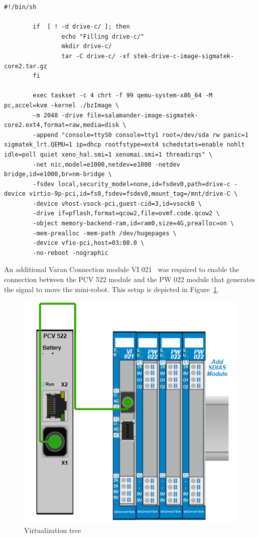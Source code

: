 \documentclass[MMR,Master,english]{twbook}
\begin{document}
\clearpage

\vspace*{-5em}
\begin{lstlisting}[name={Include PCI in QEMU for Salamander 4 Virtualization},label={script:qemu_def_pci}]
		#!/bin/sh

		if  [ ! -d drive-c/ ]; then
				echo "Filling drive-c/"
				mkdir drive-c/
				tar -C drive-c/ -xf stek-drive-c-image-sigmatek-core2.tar.gz
		fi
			
		exec taskset -c 4 chrt -f 99 qemu-system-x86_64 -M pc,accel=kvm -kernel ./bzImage \
		-m 2048 -drive file=salamander-image-sigmatek-core2.ext4,format=raw,media=disk \
		-append "console=ttyS0 console=tty1 root=/dev/sda rw panic=1 sigmatek_lrt.QEMU=1 ip=dhcp rootfstype=ext4 schedstats=enable nohlt idle=poll quiet xeno_hal.smi=1 xenomai.smi=1 threadirqs" \
		-net nic,model=e1000,netdev=e1000 -netdev bridge,id=e1000,br=nm-bridge \
		-fsdev local,security_model=none,id=fsdev0,path=drive-c -device virtio-9p-pci,id=fs0,fsdev=fsdev0,mount_tag=/mnt/drive-C \
		-device vhost-vsock-pci,guest-cid=3,id=vsock0 \
		-drive if=pflash,format=qcow2,file=ovmf.code.qcow2 \
		-object memory-backend-ram,id=ram0,size=4G,prealloc=on \
		-mem-prealloc -mem-path /dev/hugepages \
		-device vfio-pci,host=03:00.0 \
		-no-reboot -nographic
	\end{lstlisting}
\vspace{2em}
\noindent An additional Varan Connection module VI 021~\cite{InterfacesSplittersSIGMATEK} was required to enable the connection between the PCV 522 module and the PW 022 module that generates the signal to move the mini-robot. This setup is depicted in Figure~\ref{fig:virt_tree}.

\begin{figure}[H]
	\centering
	\includegraphics[width=0.5\columnwidth]{img/experiment/virt_tree.png}
	\caption[Virtualization tree]{Virtualization tree}
	\label{fig:virt_tree}
\end{figure}
\end{document}
